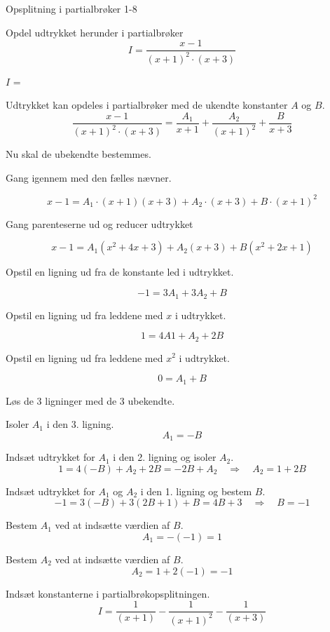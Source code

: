 \documentclass{article}
\begin{document}
\begin{exercise}{Opsplitning i partialbrøker 1-8}
	
	Opdel udtrykket herunder i partialbrøker
	\[
	I = \frac{x - 1}{(x + 1)^2 \cdot (x + 3)}
	\]
	
	$I$ =  
	
	\hint
	Udtrykket kan opdeles i partialbrøker med de ukendte konstanter $A$ og $B$.
	\[
	\frac{x - 1}{(x + 1)^2 \cdot (x + 3)} = 
	\frac{A_1}{x + 1} + \frac{A_2}{(x+1)^2} + \frac{B}{x + 3}
	\]
	
	\hint
	Nu skal de ubekendte bestemmes.
	
	\hint
	Gang igennem med den fælles nævner.
	
	\hint
	\[
	x-1 = A_1 \cdot (x + 1)(x+3) + A_2 \cdot (x+3)  + B \cdot (x + 1)^2
	\]
	
	\hint
	Gang parenteserne ud og reducer udtrykket
	
	\hint
	\[
	x - 1 = A_1(x^2 + 4x + 3) + A_2(x+3) + B(x^2 + 2x + 1)
	\]
	
	\hint
	Opstil en ligning ud fra de konstante led i udtrykket.
	
	\hint
	\[
	-1 = 3A_1 + 3A_2 + B
	\]
	
	\hint
	Opstil en ligning ud fra leddene med $x$ i udtrykket.
	
	\hint
	\[
	1 = 4A1 + A_2 + 2B
	\]
	
	\hint
	Opstil en ligning ud fra leddene med $x^2$ i udtrykket.
	
	\hint
	\[
	0 = A_1 + B
	\]
	
	\hint
	Løs de 3 ligninger med de 3 ubekendte.
	
	\hint
	Isoler $A_1$ i den 3. ligning.
	\[
	A_1  =  -B
	\]
	
	\hint
	Indsæt udtrykket for $A_1$ i den 2. ligning og isoler $A_2$.
	\[
	1 = 4(-B) + A_2 + 2B = -2B + A_2 \quad	\Rightarrow 	\quad A_2 = 1 + 2B
	\]
	
	\hint
	Indsæt udtrykket for $A_1$ og $A_2$ i den 1. ligning og bestem $B$.
	\[
	-1= 3(-B) + 3(2B+1) + B = 4B + 3	\quad 	\Rightarrow 		\quad B =  -1
	\]
	
	\hint
	Bestem $A_1$ ved at indsætte værdien af $B$.
	\[
	A_1 = - (-1) = 1 
	\]
	
	\hint
	Bestem $A_2$ ved at indsætte værdien af $B$.
	\[
	A_2 = 1 + 2(-1) = -1
	\]
	
	\hint
	Indsæt konstanterne i partialbrøkopsplitningen.
	\[
	I = \frac{1}{(x+1)} - \frac{1}{(x+1)^2} - \frac{1}{(x+3)}
	\]
	
	
	
\end{exercise}
\end{document}
